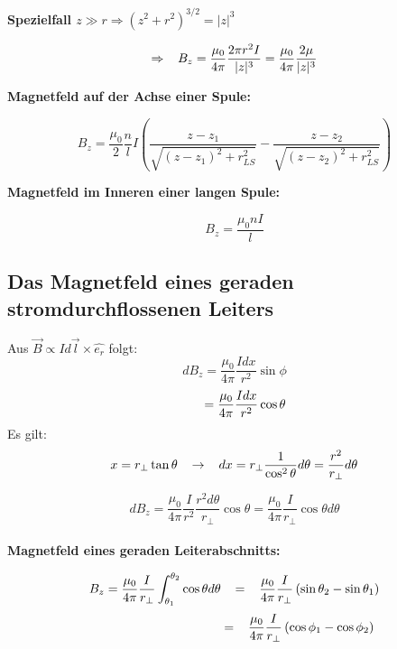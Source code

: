 \textbf{Spezielfall $z \gg r \Rightarrow (z^2 + r^2)^{3/2} = |z|^3$}
\begin{formulabox}
    \[
        \Rightarrow \hspace{3mm} B_z = \frac{\mu_0}{4\pi} \frac{2 \pi r^2 I}{|z|^3} = \frac{\mu_0}{4\pi} \frac{2 \mu}{|z|^3}
    \]
\end{formulabox}

\textbf{Magnetfeld auf der Achse einer Spule:}
\begin{formulabox}
    \[
        B_z = \frac{\mu_0}{2}\frac{n}{l} I \left( \frac{z - z_1}{\sqrt{\left( z - z_1 \right)^2 + r^2_{LS}}} - \frac{z - z_2}{\sqrt{\left( z - z_2 \right)^2 + r^2_{LS}}}\right)
    \]
\end{formulabox} 

\textbf{Magnetfeld im Inneren einer langen Spule:}
\begin{formulabox}
    \[
        B_z = \frac{\mu_0 n I}{l}
    \]
\end{formulabox}

\subsection{Das Magnetfeld eines geraden stromdurchflossenen Leiters}
Aus $\Vec{B} \propto I d\Vec{l} \times \hat{e_r}$ folgt:
\[
    dB_z = \frac{\mu_0}{4 \pi} \frac{I dx}{r^2} \sin{\phi}
\]\[
    \hspace{6mm} = \frac{\mu_0}{4 \pi} \frac{I dx}{r^2} \cos{\theta}
\]
Es gilt:
\[
x = r_{\perp} \tan{\theta} \hspace{3mm} \rightarrow \hspace{3mm} dx = r_{\perp} \frac{1}{\cos^2{\theta}} d\theta  = \frac{r^2}{r_{\perp}} d\theta
\]

\[
    dB_z = \frac{\mu_0}{4 \pi} \frac{I}{r^2} \frac{r^2 d\theta}{r_{\perp}} \cos{\theta} = \frac{\mu_0}{4 \pi} \frac{I}{r_{\perp}} \cos{\theta} d\theta
\]
\\[1ex]
\textbf{Magnetfeld eines geraden Leiterabschnitts:}
\begin{formulabox}
    \[
        B_z = \frac{\mu_0}{4 \pi} \frac{I}{r_{\perp}} \int_{\theta_1}^{\theta_2} \cos{\theta} d\theta \hspace{3mm} = \hspace{3mm} \frac{\mu_0}{4 \pi} \frac{I}{r_{\perp}} \left( \sin{\theta_2} - \sin{\theta_1} \right)
    \]
    \[
        \hspace{36mm} = \hspace{3mm} \frac{\mu_0}{4 \pi} \frac{I}{r_{\perp}} \left( \cos{\phi_1} - \cos{\phi_2} \right)
    \]
\end{formulabox}

